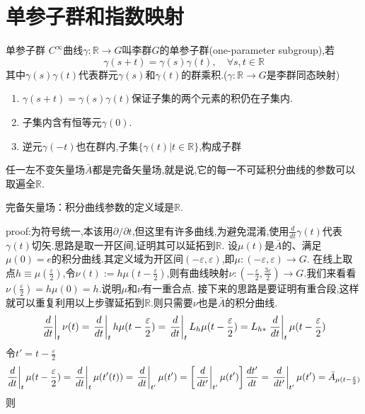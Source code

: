 \documentclass[../main.tex]{subfiles}
\begin{document}
\chapter{单参子群和指数映射}
\begin{definition}{}{单参子群}
     $C^\infty$曲线$\gamma : \mathbb{R} \rightarrow G$叫李群$G$的单参子群(one-parameter subgroup),若
    $$ \gamma(s+t) = \gamma(s)\gamma(t),\quad \forall s,t \in \mathbb{R} $$
其中$\gamma(s)\gamma(t)$代表群元$\gamma(s)$和$\gamma(t)$的群乘积.($\gamma:\mathbb{R}\rightarrow G$是李群同态映射)
\end{definition}
\begin{enumerate}
    \item $\gamma(s+t)=\gamma(s)\gamma(t)$保证子集的两个元素的积仍在子集内.
    \item 子集内含有恒等元$\gamma(0)$.
    \item 逆元$\gamma(-t)$也在群内,子集$\{\gamma(t)|t\in \mathbb{R}\}$,构成子群
\end{enumerate}
\begin{theorem}
    任一左不变矢量场$\bar{A}$都是完备矢量场,就是说,它的每一不可延积分曲线的参数可以取遍全$\mathbb{R}$.
\end{theorem}
\begin{note}
    完备矢量场：积分曲线参数的定义域是$\mathbb{R}$.
\end{note}
proof:为符号统一,本该用$\partial/\partial t$,但这里有许多曲线,为避免混淆,使用$\frac{d}{dt}\gamma(t)$代表$\gamma(t)$切矢.思路是取一开区间,证明其可以延拓到$\mathbb{R}$.
设$\mu(t)$是$\bar{A}$的、满足$\mu(0)=e$的积分曲线.其定义域为开区间$(-\varepsilon,\varepsilon)$,即$\mu:(-\varepsilon,\varepsilon)\rightarrow G$.
在线上取点$h\equiv \mu(\frac{\varepsilon}{2})$,令$\nu(t):= h\mu(t - \frac{\varepsilon}{2})$,则有曲线映射$\nu:(-\frac{\varepsilon}{2},\frac{3\varepsilon}{2}) \rightarrow G$.我们来看看$\nu(\frac{\varepsilon}{2}) = h \mu(0) = h$.说明$\mu$和$\nu$有一重合点.
接下来的思路是要证明有重合段,这样就可以重复利用以上步骤延拓到$\mathbb{R}$.则只需要$\nu$也是$\bar{A}$的积分曲线.
    $$ \left.\frac{d}{dt}\right|_{t}\nu(t) = \left.\frac{d}{dt}\right|_{t}h\mu(t - \frac{\varepsilon}{2}) =\left.\frac{d}{dt}\right|_tL_h\mu(t-\frac{\varepsilon}{2}) \\= L_{h*}\left.\frac{d}{dt}\right|_t\mu(t-\frac{\varepsilon}{2}) $$
令$t' = t-\frac{\varepsilon}{2}$
    $$ \left.\frac{d}{dt}\right|_t\mu(t-\frac{\varepsilon}{2}) = \left.\frac{d}{dt}\right|_t\mu(t'(t)) = \left.\frac{d}{dt}\right|_{t'}\mu(t') \\=\left[\left.\frac{d}{dt'}\right|_{t'}\mu(t')\right] \frac{dt'}{dt} = \left.\frac{d}{dt'}\right|_{t'}\mu(t') = \bar{A}_{\mu(t - \frac{\varepsilon}{2})_{}} $$ 则
\end{document}
